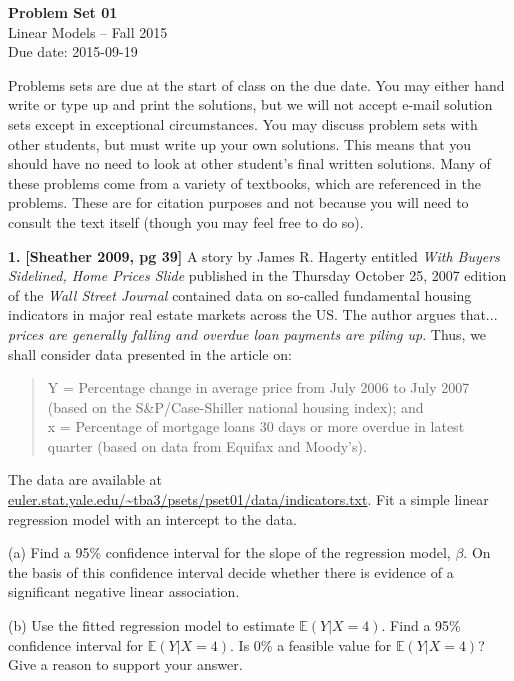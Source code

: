 \documentclass[12pt]{article}
\begin{document}
\begin{center}
{\bf Problem Set 01} \\
Linear Models -- Fall 2015 \\
Due date: 2015-09-19
\end{center}

\medskip

Problems sets are due at the start of class on the due date. You may either hand write
or type up and print the solutions, but we will not accept e-mail solution sets except
in exceptional circumstances. You may discuss problem sets with other students, but must
write up your own solutions. This means that you should have no need to look at other
student's final written solutions. Many of these problems come from a variety of textbooks,
which are referenced in the problems. These are for citation purposes and not because
you will need to consult the text itself (though you may feel free to do so).

\medskip

{\bf 1.} {\bf [Sheather 2009, pg 39]} A story by James R. Hagerty entitled {\it With Buyers Sidelined, Home Prices Slide} published in the Thursday October 25, 2007 edition of the {\it Wall Street Journal} contained data on so-called fundamental housing indicators in major real estate markets across the US. The author argues that... {\it prices are generally falling and overdue loan payments are piling up}. Thus, we shall consider data presented in the article on:

\begin{quote}
Y = Percentage change in average price from July 2006 to July 2007 (based on the S\&P/Case-Shiller national housing index); and \\
x = Percentage of mortgage loans 30 days or more overdue in latest quarter (based on data from Equifax and Moody’s).
\end{quote}

The data are available at \url{euler.stat.yale.edu/~tba3/psets/pset01/data/indicators.txt}. Fit a simple linear regression model with an intercept to the data.

(a) Find a 95\% confidence interval for the slope of the regression model, $\beta$. On the basis of this confidence interval decide whether there is evidence of a significant negative linear association.

(b) Use the fitted regression model to estimate $\mathbb{E}(Y | X=4)$. Find a 95\% confidence interval for $\mathbb{E}(Y | X=4)$. Is 0\% a feasible value for $\mathbb{E}(Y | X=4)$? Give a reason to support your answer.
\end{document}
